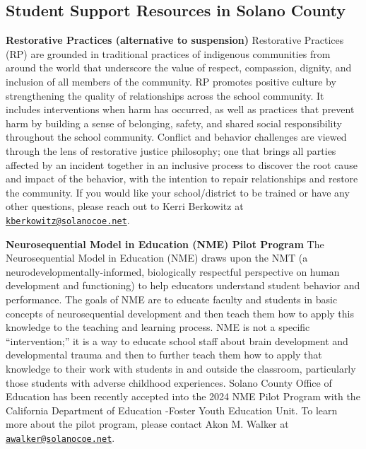\documentclass[
  10pt,
  letterpaper,
  DIV=11,
  numbers=noendperiod]{scrartcl}
\begin{document}
\subsection{Student Support Resources in Solano
County}\label{student-support-resources-in-solano-county}

\textbf{Restorative Practices (alternative to suspension)} Restorative
Practices (RP) are grounded in traditional practices of indigenous
communities from around the world that underscore the value of respect,
compassion, dignity, and inclusion of all members of the community. RP
promotes positive culture by strengthening the quality of relationships
across the school community. It includes interventions when harm has
occurred, as well as practices that prevent harm by building a sense of
belonging, safety, and shared social responsibility throughout the
school community. Conflict and behavior challenges are viewed through
the lens of restorative justice philosophy; one that brings all parties
affected by an incident together in an inclusive process to discover the
root cause and impact of the behavior, with the intention to repair
relationships and restore the community. If you would like your
school/district to be trained or have any other questions, please reach
out to Kerri Berkowitz at
\href{mailto:kberkowitz@solanocoe.net}{\nolinkurl{kberkowitz@solanocoe.net}}.

\textbf{Neurosequential Model in Education (NME) Pilot Program} The
Neurosequential Model in Education (NME) draws upon the NMT (a
neurodevelopmentally-informed, biologically respectful perspective on
human development and functioning) to help educators understand student
behavior and performance. The goals of NME are to educate faculty and
students in basic concepts of neurosequential development and then teach
them how to apply this knowledge to the teaching and learning process.
NME is not a specific ``intervention;'' it is a way to educate school
staff about brain development and developmental trauma and then to
further teach them how to apply that knowledge to their work with
students in and outside the classroom, particularly those students with
adverse childhood experiences. Solano County Office of Education has
been recently accepted into the 2024 NME Pilot Program with the
California Department of Education -Foster Youth Education Unit. To
learn more about the pilot program, please contact Akon M. Walker at
\href{mailto:awalker@solanocoe.net}{\nolinkurl{awalker@solanocoe.net}}.
\end{document}
